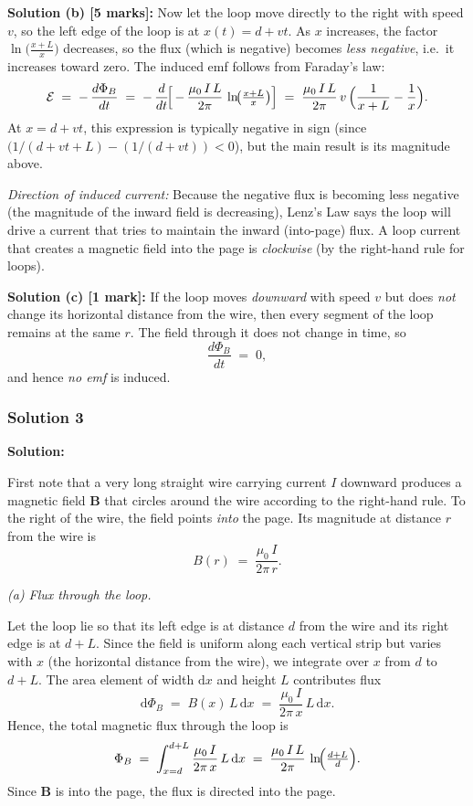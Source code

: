 \documentclass{article}
\begin{document}
\vspace{12pt}
\noindent
\textbf{Solution (b) [5 marks]:} 
Now let the loop move directly to the right with speed $v$, so the left edge of the loop is at $x(t)=d + vt$.  As $x$ increases, the factor $\ln\!\bigl(\frac{x+L}{x}\bigr)$ decreases, so the flux (which is negative) becomes \emph{less negative}, i.e.\ it increases toward zero.  The induced emf follows from Faraday's law:
\[
\mathcal{E}
\;=\;
-\,\frac{d\Phi_B}{dt}
\;=\;
-\,\frac{d}{dt}\!\Bigl[\,-\,\frac{\mu_0\,I\,L}{2\pi}\,\ln\!\bigl(\tfrac{x+L}{x}\bigr)\Bigr]
\;=\;
\frac{\mu_0\,I\,L}{2\pi}\,v \,\Bigl(\frac{1}{x+L} - \frac{1}{x}\Bigr).
\]
At $x=d+vt$, this expression is typically negative in sign (since $(1/(d+vt+L)-(1/(d+vt))<0$), but the main result is its magnitude above.  

\noindent
\emph{Direction of induced current:}  Because the negative flux is becoming less negative (the magnitude of the inward field is decreasing), Lenz's Law says the loop will drive a current that tries to maintain the inward (into-page) flux.  A loop current that creates a magnetic field into the page is \emph{clockwise} (by the right-hand rule for loops). 

\vspace{12pt}
\noindent
\textbf{Solution (c) [1 mark]:}
If the loop moves \emph{downward} with speed $v$ but does \emph{not} change its horizontal distance from the wire, then every segment of the loop remains at the same $r$.  The field through it does not change in time, so 
\[
\frac{d\Phi_B}{dt} \;=\; 0,
\]
and hence \emph{no emf} is induced. 


\subsubsection{Solution 3}
\noindent
\textbf{Solution:}

First note that a very long straight wire carrying current $I$ downward produces a magnetic field $\mathbf{B}$ that circles around the wire according to the right-hand rule. To the right of the wire, the field points \emph{into} the page. Its magnitude at distance $r$ from the wire is
\[
B(r) \;=\; \frac{\mu_0\,I}{2\pi\,r}.
\]

\noindent
\emph{(a) Flux through the loop.}

Let the loop lie so that its left edge is at distance $d$ from the wire and its right edge is at $d + L$.  Since the field is uniform along each vertical strip but varies with $x$ (the horizontal distance from the wire), we integrate over $x$ from $d$ to $d + L$.  The area element of width $\mathrm{d}x$ and height $L$ contributes flux
\[
\mathrm{d}\Phi_B \;=\; B(x)\,L\,\mathrm{d}x
\;=\; \frac{\mu_0\,I}{2\pi\,x}\,L\,\mathrm{d}x.
\]
Hence, the total magnetic flux through the loop is
\[
\Phi_B \;=\; \int_{x=d}^{d+L} \frac{\mu_0\,I}{2\pi\,x}\,L\,\mathrm{d}x
\;=\;
\frac{\mu_0\,I\,L}{2\pi}\,\ln\!\Bigl(\tfrac{d+L}{d}\Bigr).
\]
Since $\mathbf{B}$ is into the page, the flux is directed into the page.
\end{document}
